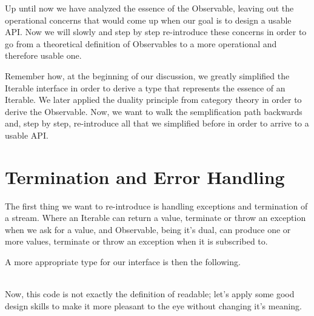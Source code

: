 \let\textcircled=\pgftextcircled
{}



Up until now we have analyzed the essence of the Observable, leaving out the operational concerns that would come up when our goal is to design a usable API. Now we will slowly and step by step re-introduce these concerns in order to go from a theoretical definition of Observables to a more operational and therefore usable one.

Remember how, at the beginning of our discussion, we greatly simplified the Iterable interface in order to derive a type that represents the essence of an Iterable. We later applied the duality principle from category theory in order to derive the Observable. Now, we want to walk the semplification path backwards and, step by step, re-introduce all that we simplified before in order to arrive to a usable API.

\section{Termination and Error Handling}

The first thing we want to re-introduce is handling exceptions and termination of a stream. Where an Iterable can return a value, terminate or throw an exception when we ask for a value, and Observable, being it's dual, can produce one or more values, terminate or throw an exception when it is subscribed to. 

A more appropriate type for our interface is then the following.\\

\\


Now, this code is not exactly the definition of readable; let's apply some good design skills to make it more pleasant to the eye without changing it's meaning.\\

\\

